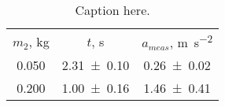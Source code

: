 \begin{table}
\begin{center}
\begin{ruledtabular}
\begin{tabular}{ccc}
$m_2$, \unit{\kilo\gram} & $t$, \unit{\second} & $a_{meas}$, \unit{\meter\per\second\squared} \\ 
\num{0.050} & \num{2.31\pm0.10} & \num{0.26\pm0.02} \\ 
\num{0.200} & \num{1.00\pm0.16} & \num{1.46\pm0.41} \\ 
\end{tabular}
\end{ruledtabular}
\end{center}
\caption{\label{tab:newtable1} Caption here.}
\end{table}
